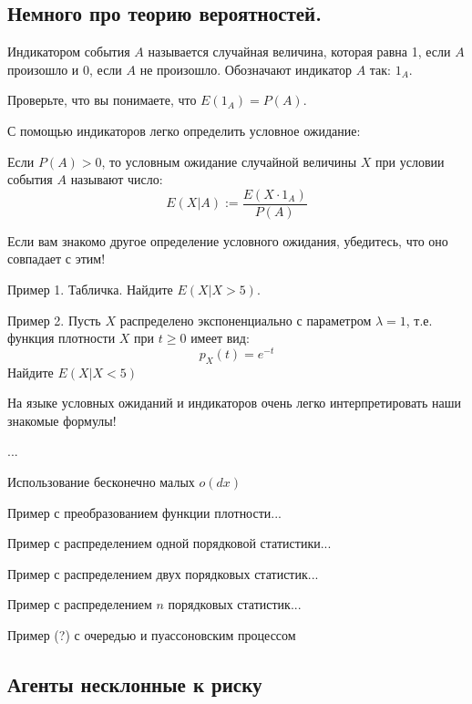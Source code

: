 


\subsection{Немного про теорию вероятностей.}

\begin{mydef}
Индикатором события $ A $ называется случайная величина, которая равна 1, если $ A $ произошло и 0, если $ A $ не произошло. Обозначают индикатор $ A $ так: $ 1_{A} $.
\end{mydef}

Проверьте, что вы понимаете, что $ E(1_{A})=P(A) $.

С помощью индикаторов легко определить условное ожидание:

\begin{mydef}
Если $ P(A)>0 $, то условным ожидание случайной величины $ X $ при условии события $ A $ называют число:
\[ E(X|A):=\frac{E(X\cdot 1_{A})}{P(A)} \]
\end{mydef}

Если вам знакомо другое определение условного ожидания, убедитесь, что оно совпадает с этим!

Пример 1. Табличка. Найдите $ E(X|X>5) $.


Пример 2. Пусть $ X $ распределено экспоненциально с параметром $ \lambda=1 $, т.е. функция плотности $ X $ при $ t\geq 0 $ имеет вид: 
\[ p_{X}(t)=e^{-t} \]
Найдите $ E(X|X<5) $

На языке условных ожиданий и индикаторов очень легко интерпретировать наши знакомые формулы!

...





Использование бесконечно малых $o(dx)$

Пример с преобразованием функции плотности...

Пример с распределением одной порядковой статистики...

Пример с распределением двух порядковых статистик...

Пример с распределением $ n $ порядковых статистик...

Пример (?) с очередью и пуассоновским процессом



\subsection{Агенты несклонные к риску}

